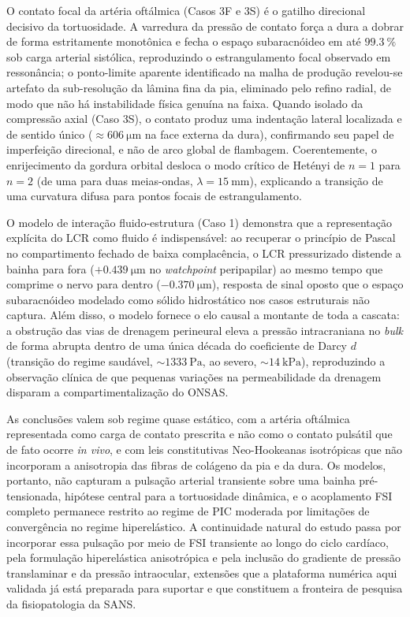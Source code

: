 \documentclass[12pt,a4paper]{article}
\begin{document}
O contato focal da artéria oftálmica (Casos 3F e 3S) é o gatilho direcional decisivo da tortuosidade. A varredura da pressão de contato força a dura a dobrar de forma estritamente monotônica e fecha o espaço subaracnóideo em até $\SI{99,3}{\%}$ sob carga arterial sistólica, reproduzindo o estrangulamento focal observado em ressonância; o ponto-limite aparente identificado na malha de produção revelou-se artefato da sub-resolução da lâmina fina da pia, eliminado pelo refino radial, de modo que não há instabilidade física genuína na faixa. Quando isolado da compressão axial (Caso 3S), o contato produz uma indentação lateral localizada e de sentido único ($\approx \SI{606}{\micro\meter}$ na face externa da dura), confirmando seu papel de imperfeição direcional, e não de arco global de flambagem. Coerentemente, o enrijecimento da gordura orbital desloca o modo crítico de Hetényi de $n = 1$ para $n = 2$ (de uma para duas meias-ondas, $\lambda = \SI{15}{\milli\meter}$), explicando a transição de uma curvatura difusa para pontos focais de estrangulamento.

O modelo de interação fluido-estrutura (Caso 1) demonstra que a representação explícita do LCR como fluido é indispensável: ao recuperar o princípio de Pascal no compartimento fechado de baixa complacência, o LCR pressurizado distende a bainha para fora ($+\SI{0,439}{\micro\meter}$ no \emph{watchpoint} peripapilar) ao mesmo tempo que comprime o nervo para dentro ($-\SI{0,370}{\micro\meter}$), resposta de sinal oposto que o espaço subaracnóideo modelado como sólido hidrostático nos casos estruturais não captura. Além disso, o modelo fornece o elo causal a montante de toda a cascata: a obstrução das vias de drenagem perineural eleva a pressão intracraniana no \emph{bulk} de forma abrupta dentro de uma única década do coeficiente de Darcy $d$ (transição do regime saudável, $\sim\SI{1333}{\pascal}$, ao severo, $\sim\SI{14}{\kilo\pascal}$), reproduzindo a observação clínica de que pequenas variações na permeabilidade da drenagem disparam a compartimentalização do ONSAS.

As conclusões valem sob regime quase estático, com a artéria oftálmica representada como carga de contato prescrita e não como o contato pulsátil que de fato ocorre \emph{in vivo}, e com leis constitutivas Neo-Hookeanas isotrópicas que não incorporam a anisotropia das fibras de colágeno da pia e da dura. Os modelos, portanto, não capturam a pulsação arterial transiente sobre uma bainha pré-tensionada, hipótese central para a tortuosidade dinâmica, e o acoplamento FSI completo permanece restrito ao regime de PIC moderada por limitações de convergência no regime hiperelástico. A continuidade natural do estudo passa por incorporar essa pulsação por meio de FSI transiente ao longo do ciclo cardíaco, pela formulação hiperelástica anisotrópica e pela inclusão do gradiente de pressão translaminar e da pressão intraocular, extensões que a plataforma numérica aqui validada já está preparada para suportar e que constituem a fronteira de pesquisa da fisiopatologia da SANS.
\end{document}
